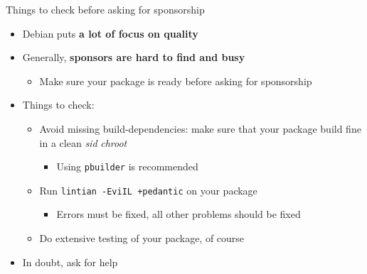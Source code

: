 \documentclass[10pt,final]{beamer}
\begin{document}
\begin{frame}{Things to check before asking for sponsorship}
\begin{itemize}
	\item Debian puts \textbf{a lot of focus on quality}
\hbr
\item Generally, \textbf{sponsors are hard to find and busy}
\begin{itemize}
\item Make sure your package is ready before asking for sponsorship
\end{itemize}
\hbr
\item Things to check:
\begin{itemize}
\item Avoid missing build-dependencies: make sure that your package build fine in a clean \textsl{sid} \textsl{chroot}
\begin{itemize}
\item Using \texttt{pbuilder} is recommended
\end{itemize}
\hbr
\item Run \texttt{lintian -EviIL +pedantic} on your package
\begin{itemize}
\item Errors must be fixed, all other problems should be fixed
\end{itemize}
\hbr
\item Do extensive testing of your package, of course
\end{itemize}
\hbr
\item In doubt, ask for help
\end{itemize}
\end{frame}
\end{document}
